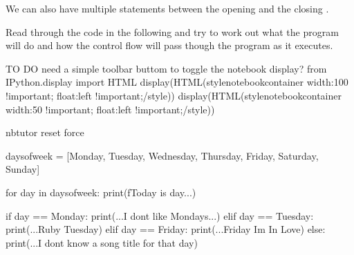 \documentclass[letterpaper,10pt,english]{sphinxmanual}
\begin{document}
{We can also have multiple  statements between the opening  and the closing .

Read through the code in the following and try to work out what the program will do and how the control flow will pass though the program as it executes.

{
\begin{sphinxVerbatim}[commandchars=\\\{\}]
\llap{\color{nbsphinxin}[ ]:\,\hspace{\fboxrule}\hspace{\fboxsep}}\PYGZsh{} TO DO
\PYGZsh{} need a simple toolbar buttom to toggle the notebook display?
from IPython.display import HTML
display(HTML(\PYGZdq{}\PYGZlt{}style\PYGZgt{}\PYGZsh{}notebook\PYGZhy{}container \PYGZob{} width:100\PYGZpc{} !important; float:left !important;\PYGZcb{}\PYGZlt{}/style\PYGZgt{}\PYGZdq{}))
display(HTML(\PYGZdq{}\PYGZlt{}style\PYGZgt{}\PYGZsh{}notebook\PYGZhy{}container \PYGZob{} width:50\PYGZpc{} !important; float:left !important;\PYGZcb{}\PYGZlt{}/style\PYGZgt{}\PYGZdq{}))

\end{sphinxVerbatim}
}

{
\begin{sphinxVerbatim}[commandchars=\\\{\}]
\llap{\color{nbsphinxin}[ ]:\,\hspace{\fboxrule}\hspace{\fboxsep}}\PYGZpc{}\PYGZpc{}nbtutor \PYGZhy{}\PYGZhy{}reset \PYGZhy{}\PYGZhy{}force

days\PYGZus{}of\PYGZus{}week = [\PYGZsq{}Monday\PYGZsq{}, \PYGZsq{}Tuesday\PYGZsq{}, \PYGZsq{}Wednesday\PYGZsq{}, \PYGZsq{}Thursday\PYGZsq{},
                \PYGZsq{}Friday\PYGZsq{}, \PYGZsq{}Saturday\PYGZsq{}, \PYGZsq{}Sunday\PYGZsq{}]

for day in days\PYGZus{}of\PYGZus{}week:
    print(f\PYGZsq{}Today is \PYGZob{}day\PYGZcb{}...\PYGZsq{})

    if day == \PYGZsq{}Monday\PYGZsq{}:
        print(\PYGZdq{}...I don\PYGZsq{}t like Mondays...\PYGZdq{})
    elif day == \PYGZsq{}Tuesday\PYGZsq{}:
        print(\PYGZsq{}...Ruby Tuesday\PYGZsq{})
    elif day == \PYGZsq{}Friday\PYGZsq{}:
        print(\PYGZdq{}...Friday I\PYGZsq{}m In Love\PYGZdq{})
    else:
        print(\PYGZdq{}...I don\PYGZsq{}t know a song title for that day\PYGZdq{})
\end{sphinxVerbatim}
}

}
\end{document}
